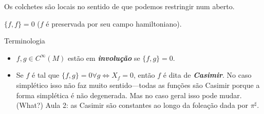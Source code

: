 \begin{remark}\leavevmode
Os colchetes  são locais no sentido de que podemos restringir num aberto.
\end{remark}
\begin{remark}\leavevmode
\(\{f,f\}=0\) (\(f\) é preservada por seu campo hamiltoniano).
\end{remark}
\begin{thing6}{Terminologia}\leavevmode
\begin{itemize}
\item \(f,g \in C^\infty(M)\) estão em  \textit{\textbf{involução}} se \(\{f,g\}=0\).
\item Se \(f\) é tal que \(\{f,g\}=0 \forall g \iff X_f=0\), então \(f\) é dita de \textit{\textbf{Casimir}}. No caso simplético isso não faz muito sentido---todas as funções são Casimir porque a forma simplética é não degenerada. Mas no caso geral isso pode mudar. (What?) Aula 2: as Casimir são constantes ao longo da foleação dada por \(\pi ^\sharp\).
\end{itemize}
\end{thing6}

